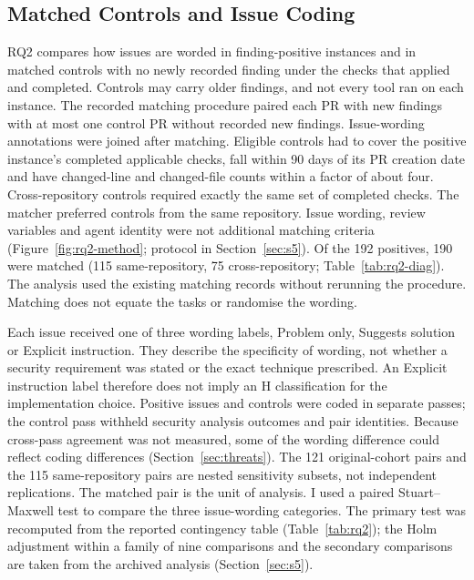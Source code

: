 \documentclass[acmsmall,screen,nonacm,review]{acmart}
\begin{document}
\subsection{Matched Controls and Issue Coding}\label{sec:rq2-design}

RQ2 compares how issues are worded in finding-positive instances and in matched controls with no newly recorded finding under the checks that applied and completed. Controls may carry older findings, and not every tool ran on each instance. The recorded matching procedure paired each PR with new findings with at most one control PR without recorded new findings. Issue-wording annotations were joined after matching. Eligible controls had to cover the positive instance's completed applicable checks, fall within 90 days of its PR creation date and have changed-line and changed-file counts within a factor of about four. Cross-repository controls required exactly the same set of completed checks. The matcher preferred controls from the same repository. Issue wording, review variables and agent identity were not additional matching criteria (Figure~\ref{fig:rq2-method}; protocol in Section~\ref{sec:s5}). Of the 192 positives, 190 were matched (115 same-repository, 75 cross-repository; Table~\ref{tab:rq2-diag}). The analysis used the existing matching records without rerunning the procedure. Matching does not equate the tasks or randomise the wording.

Each issue received one of three wording labels, Problem only, Suggests solution or Explicit instruction. They describe the specificity of wording, not whether a security requirement was stated or the exact technique prescribed. An Explicit instruction label therefore does not imply an H classification for the implementation choice. Positive issues and controls were coded in separate passes; the control pass withheld security analysis outcomes and pair identities. Because cross-pass agreement was not measured, some of the wording difference could reflect coding differences (Section~\ref{sec:threats}). The 121 original-cohort pairs and the 115 same-repository pairs are nested sensitivity subsets, not independent replications. The matched pair is the unit of analysis. I used a paired Stuart--Maxwell test to compare the three issue-wording categories. The primary test was recomputed from the reported contingency table (Table~\ref{tab:rq2}); the Holm adjustment within a family of nine comparisons and the secondary comparisons are taken from the archived analysis (Section~\ref{sec:s5}).
\end{document}
